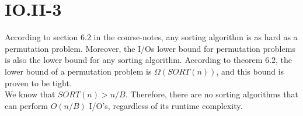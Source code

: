 \section*{IO.II-3}

According to section $6.2$ in the course-notes, any sorting algorithm is as hard as a permutation problem. Moreover, the I/Os lower bound for permutation problems is also the lower bound for any sorting algorithm. According to theorem $6.2$, the lower bound of a permutation problem is $\Omega(SORT(n))$, and this bound is proven to be tight.\\

We know that $SORT(n) > n/B$. Therefore, there are no sorting algorithms that can perform $O(n/B)$ I/O's, regardless of its runtime complexity.
